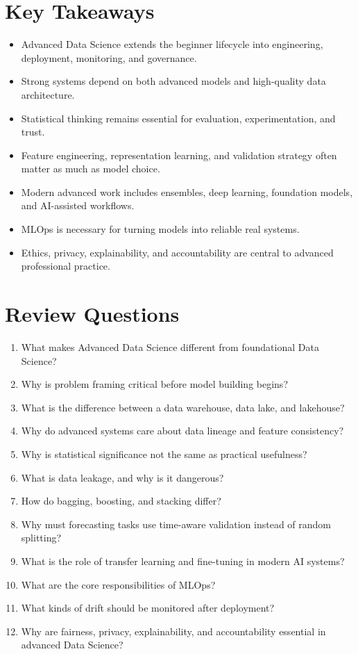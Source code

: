 \documentclass[11pt,a4paper]{article}
\begin{document}
\section{Key Takeaways}

\begin{itemize}[leftmargin=*]
  \item Advanced Data Science extends the beginner lifecycle into engineering, deployment, monitoring, and governance.
  \item Strong systems depend on both advanced models and high-quality data architecture.
  \item Statistical thinking remains essential for evaluation, experimentation, and trust.
  \item Feature engineering, representation learning, and validation strategy often matter as much as model choice.
  \item Modern advanced work includes ensembles, deep learning, foundation models, and AI-assisted workflows.
  \item MLOps is necessary for turning models into reliable real systems.
  \item Ethics, privacy, explainability, and accountability are central to advanced professional practice.
\end{itemize}

\section{Review Questions}

\begin{enumerate}[leftmargin=*]
  \item What makes Advanced Data Science different from foundational Data Science?
  \item Why is problem framing critical before model building begins?
  \item What is the difference between a data warehouse, data lake, and lakehouse?
  \item Why do advanced systems care about data lineage and feature consistency?
  \item Why is statistical significance not the same as practical usefulness?
  \item What is data leakage, and why is it dangerous?
  \item How do bagging, boosting, and stacking differ?
  \item Why must forecasting tasks use time-aware validation instead of random splitting?
  \item What is the role of transfer learning and fine-tuning in modern AI systems?
  \item What are the core responsibilities of MLOps?
  \item What kinds of drift should be monitored after deployment?
  \item Why are fairness, privacy, explainability, and accountability essential in advanced Data Science?
\end{enumerate}
\end{document}
